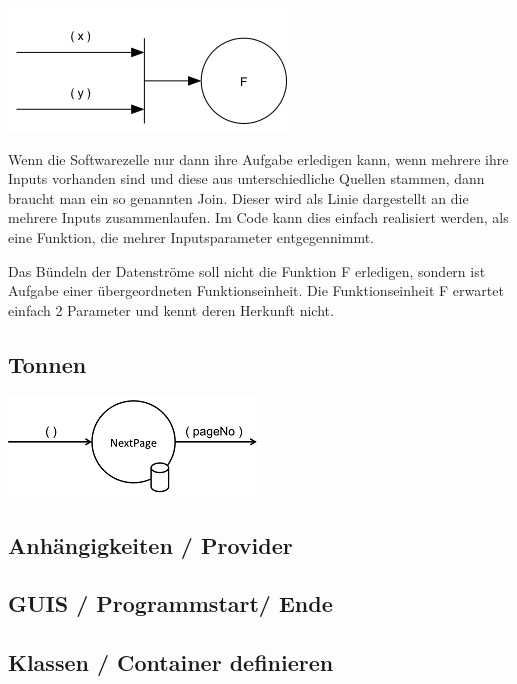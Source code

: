 \documentclass[11pt]{article}
\begin{document}
\includegraphics[width=.9\linewidth]{./img/diagramJoin.png}

Wenn die Softwarezelle nur dann ihre Aufgabe erledigen kann, wenn mehrere ihre Inputs 
vorhanden sind und diese aus unterschiedliche Quellen stammen, dann braucht man ein so genannten Join.
Dieser wird als Linie dargestellt an die mehrere Inputs zusammenlaufen.
Im Code kann dies einfach realisiert werden, als eine Funktion, die mehrer Inputsparameter entgegennimmt.

Das Bündeln der Datenströme soll nicht die Funktion F erledigen, sondern ist Aufgabe einer übergeordneten Funktionseinheit.
Die Funktionseinheit F erwartet einfach 2 Parameter und kennt deren Herkunft nicht. 

\subsection{Tonnen}
\label{sec:orgheadline14}

\includegraphics[width=.9\linewidth]{./img/diagramTonne.png}

\subsection{Anhängigkeiten / Provider}
\label{sec:orgheadline15}
\subsection{GUIS / Programmstart/ Ende}
\label{sec:orgheadline16}
\subsection{Klassen / Container definieren}
\label{sec:orgheadline17}
\end{document}
